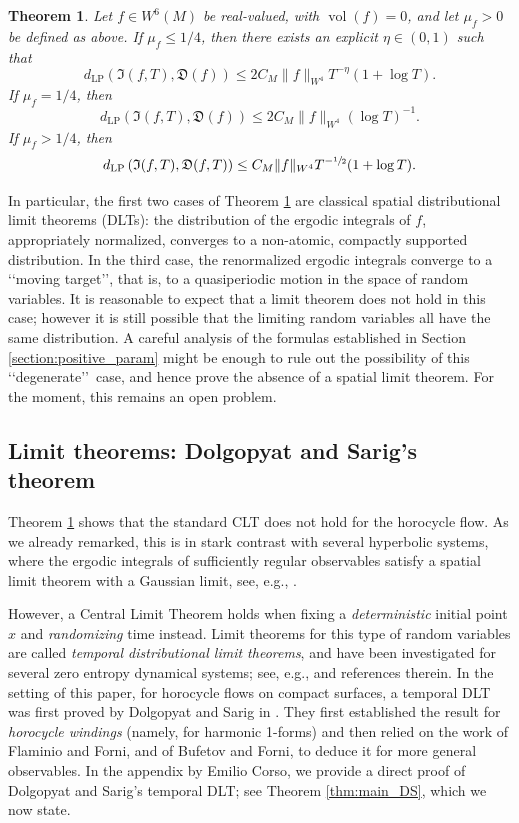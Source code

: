 \documentclass[10pt]{amsart}
\newcommand{\Levy}{d_{\levyy}}
\DeclareMathOperator{\vol}{vol}
\DeclareMathOperator{\levyy}{LP}
\newtheorem{theorem}{Theorem}
\theoremstyle{definition}
\begin{document}
\begin{theorem}\label{thm:main_BF1}
Let $f \in W^6(M)$ be real-valued, with $\vol(f)=0$, and let $\mu_f >0 $ be defined as above.
If $\mu_f \leq 1/4$, then there exists an explicit $\eta \in (0,1)$ such that
\[
\Levy \left(\mathfrak{I}(f,T), \mathfrak{D}(f) \right) \leq 2C_M \|f\|_{W^4} T^{-\eta}(1+\log T).
\]
If $\mu_f=1/4$, then
\[
\Levy \left(\mathfrak{I}(f,T), \mathfrak{D}(f) \right) \leq 2C_M \|f\|_{W^4}(\log T)^{-1}.
\]
If $\mu_f > 1/4$, then
\[
\Levy \left(\mathfrak{I}(f,T), \mathfrak{D}(f,T) \right) \leq C_M \|f\|_{W^4} T^{-\sfrac{1}{2}}(1+\log T).
\]
\end{theorem}

In particular, the first two cases of Theorem \ref{thm:main_BF1} are classical spatial distributional limit theorems (DLTs): the distribution of the ergodic integrals of $f$, appropriately normalized, converges to a non-atomic, compactly supported distribution.
In the third case, the renormalized ergodic integrals converge to a \lq\lq moving target\rq\rq, that is, to a quasiperiodic motion in the space of random variables.
It is reasonable to expect that a limit theorem does not hold in this case; however it is still possible that the limiting random variables all have the same distribution. A careful analysis of the formulas established in Section \ref{section:positive_param} might be enough to rule out the possibility of this \lq\lq degenerate\rq\rq\ case, and hence prove the absence of a spatial limit theorem. For the moment, this remains an open problem.

\subsection{Limit theorems: Dolgopyat and Sarig's theorem}

Theorem \ref{thm:main_BF1} shows that the standard CLT does not hold for the horocycle flow. As we already remarked, this is in stark contrast with several hyperbolic systems, where the ergodic integrals of sufficiently regular observables satisfy a spatial limit theorem with a Gaussian limit, see, e.g., \cite{Rat:CLT}.

However, a Central Limit Theorem holds when fixing a \emph{deterministic} initial point $x$ and \emph{randomizing} time instead.
Limit theorems for this type of random variables are called \emph{temporal distributional limit theorems}, and have been investigated for several zero entropy dynamical systems; see, e.g., \cite{Bec1, Bec2, ADDS, Dolgopyat-Sarig, PaSo, BrUl} and references therein.
In the setting of this paper, \ie for horocycle flows on compact surfaces, a temporal DLT was first proved by Dolgopyat and Sarig in \cite{Dolgopyat-Sarig}. They first established the result for \emph{horocycle windings} (namely, for harmonic 1-forms) and then relied on the work of Flaminio and Forni, and of Bufetov and Forni, to deduce it for more general observables. In the appendix by Emilio Corso, we provide a direct proof of Dolgopyat and Sarig's temporal DLT; see Theorem \ref{thm:main_DS}, which we now state.
\end{document}
